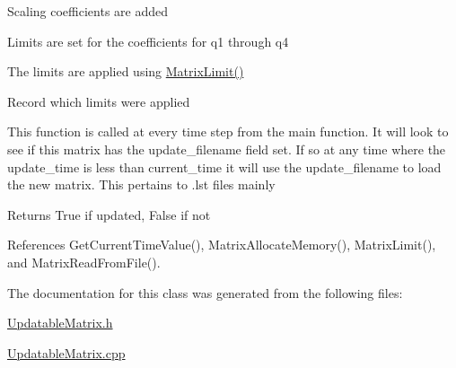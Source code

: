 Scaling coefficients are added

Limits are set for the coefficients for q1 through q4

The limits are applied using \hyperlink{_updatable_matrix_8cpp_a7c31dffc9739867a97c8a80a4391b4d5}{Matrix\+Limit()}

Record which limits were applied

This function is called at every time step from the main function. It will look to see if this matrix has the update\+\_\+filename field set. If so at any time where the update\+\_\+time is less than current\+\_\+time it will use the update\+\_\+filename to load the new matrix. This pertains to .lst files mainly

\begin{DoxyReturn}{Returns}
True if updated, False if not 
\end{DoxyReturn}


References Get\+Current\+Time\+Value(), Matrix\+Allocate\+Memory(), Matrix\+Limit(), and Matrix\+Read\+From\+File().



The documentation for this class was generated from the following files\+:\begin{DoxyCompactItemize}
\item 
\hyperlink{_updatable_matrix_8h}{Updatable\+Matrix.\+h}\item 
\hyperlink{_updatable_matrix_8cpp}{Updatable\+Matrix.\+cpp}\end{DoxyCompactItemize}
